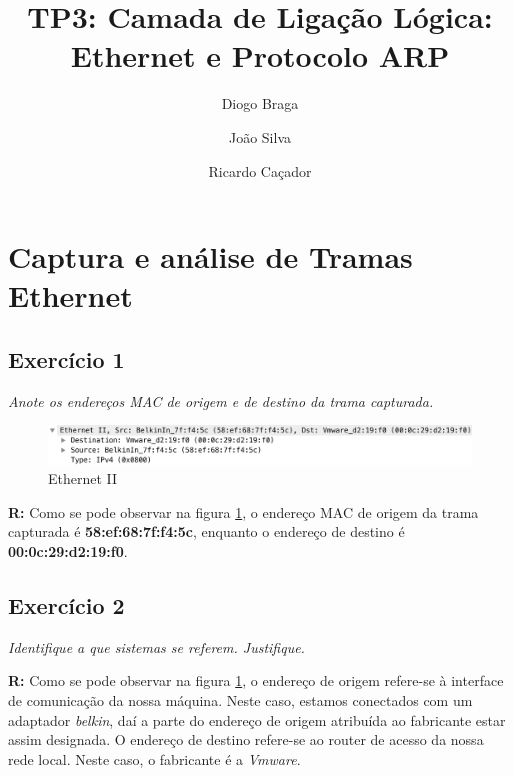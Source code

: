 \documentclass{llncs}
\begin{document}
\mainmatter
\title{TP3: Camada de Ligação Lógica: Ethernet e Protocolo ARP}


\author{Diogo Braga \and João Silva \and Ricardo Caçador}



\date{}


\maketitle

\section{Captura e análise de Tramas Ethernet}

\subsection{Exercício 1}
\emph{Anote os endereços MAC de origem e de destino da trama capturada.}

\begin{figure}[H]
\begin{center}
\includegraphics[scale=0.45]{1.png} 
\end{center}
\caption{\label{fig:1}Ethernet II}
\end{figure} 
\par
\textbf{R:} Como se pode observar na figura \ref{fig:1}, o endereço MAC de origem da trama
capturada é \textbf{58:ef:68:7f:f4:5c}, enquanto o endereço de destino é 
\textbf{00:0c:29:d2:19:f0}.


\subsection{Exercício 2}
\emph{Identifique a que sistemas se referem. Justifique.}
\\ \par
\textbf{R:} Como se pode observar na figura \ref{fig:1}, o endereço de origem refere-se à
interface de comunicação da nossa máquina. Neste caso, estamos conectados com um adaptador
\emph{belkin}, daí a parte do endereço
de origem atribuída ao fabricante estar assim designada. O endereço de destino refere-se
ao router de acesso da nossa rede local. Neste caso, o fabricante é a \emph{Vmware}.
\end{document}
